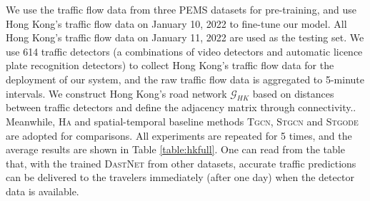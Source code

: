 \documentclass[sigconf]{acmart}
\theoremstyle{definition}
\begin{document}
We use the traffic flow data from three PEMS datasets for pre-training, and use Hong Kong's traffic flow data on January 10, 2022 to fine-tune our model. All Hong Kong's traffic flow data on January 11, 2022 are used as the testing set. We use 614 traffic detectors (a combinations of video detectors and automatic licence plate recognition detectors) to collect Hong Kong's traffic flow data for the deployment of our system, and the raw traffic flow data is aggregated to 5-minute intervals. We construct Hong Kong's road network $\mathcal{G}_{HK}$ based on distances between traffic detectors and define the adjacency matrix through connectivity.. Meanwhile, \textsc{Ha} and spatial-temporal baseline methods \textsc{Tgcn}, \textsc{Stgcn} and \textsc{Stgode} are adopted for comparisons. 
All experiments are repeated for 5 times, and the average results are shown in Table \ref{table:hkfull}. One can read from the table that, with the trained \textsc{DastNet} from other datasets, accurate traffic predictions can be delivered to the travelers immediately (after one day) when the detector data is available.
\end{document}

